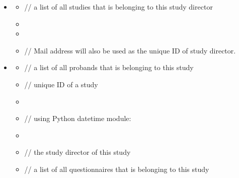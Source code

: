 \documentclass[a4paper]{scrreprt}
\begin{document}
{            \newpage	 
            \begin{itemize}
                \item {}
                    \begin{itemize}
                        \item {}
                            \par // a list of all studies that is belonging to this study director
                        \item {}
                        \item {}
                        \item {}
                            \par // Mail address will also be used as the unique ID of study director.
                    \end{itemize}

                    \item {}
                        \begin{itemize}
                            \item {}
                                \par // a list of all probands that is belonging to this study
                            \item {}
                                \par // unique ID of a study
                            \item {}
                            \item {}
                                \par // using Python datetime module: 
                            \item {}
                            \item {}
                                \par // the study director of this study
                            \item {}
                                \par // a list of all questionnaires that is belonging to this study
                        \end{itemize}


\end{itemize}}
\end{document}
